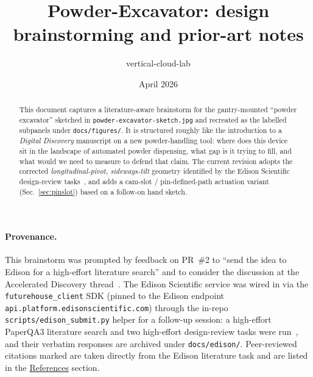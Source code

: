 \documentclass[11pt,a4paper]{article}
\title{Powder-Excavator: design brainstorming and prior-art notes}
\author{vertical-cloud-lab}
\date{April 2026}
\begin{document}
\maketitle

\begin{abstract}
\noindent
This document captures a literature-aware brainstorm for the gantry-mounted
``powder excavator'' sketched in \texttt{powder-excavator-sketch.jpg} and
recreated as the labelled subpanels under \texttt{docs/figures/}. It is
structured roughly like the introduction to a \emph{Digital Discovery}
manuscript on a new powder-handling tool: where does this device sit in the
landscape of automated powder dispensing, what gap is it trying to fill, and
what would we need to measure to defend that claim. The current revision
adopts the corrected \emph{longitudinal-pivot, sideways-tilt} geometry
identified by the Edison Scientific design-review tasks~\cite{edisonscientific},
and adds a cam-slot / pin-defined-path actuation variant (Sec.~\ref{sec:pinslot})
based on a follow-on hand sketch.
\end{abstract}

\paragraph{Provenance.}
This brainstorm was prompted by feedback on PR~\#2 to ``send the idea to
Edison for a high-effort literature search'' and to consider the discussion
at the Accelerated Discovery
thread~\cite{accdiscthread}. The Edison Scientific service was wired in via
the \texttt{futurehouse\_client} SDK (pinned to the Edison endpoint
\texttt{api.platform.edisonscientific.com}) through the in-repo
\texttt{scripts/edison\_submit.py} helper for a follow-up session: a
high-effort PaperQA3
literature search and two high-effort design-review tasks were
run~\cite{edisonscientific}, and their verbatim responses are archived under
\texttt{docs/edison/}. Peer-reviewed citations marked
\cite{tom2024selfdrivinglaboratoriesfor,yang2007meteringanddispensing,bahr2018collaborativeevaluationof,bahr2020recentadvancesin,jiang2023autonomousbiomimeticsolid,szymanski2023anautonomouslaboratory,szymanski2024automatingthesynthesis,fei2024alabosapythonbased,lunt2023modularmultirobotintegration,lunt2024aroboticworkflow,carruthers2025amobilerobotic,alsenz2011powderpickinganinexpensive,hernandezdelvalle2024pelletdispensomixerand,doloi2025democratizingselfdrivinglabs,moravkar2020traditionalandadvanced,freeman2017characterisingpowderflow,ghoroi2013multifacetedcharacterizationof,mccalla2023semiautomatedexperimentsto}
are taken directly from the Edison literature task and are listed in the
\hyperref[sec:references]{References} section.
\end{document}
